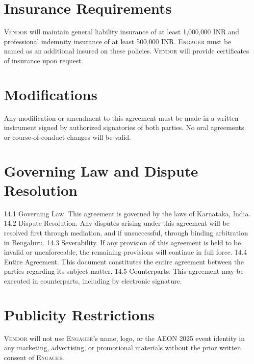 \documentclass[11pt,letterpaper]{article}
\begin{document}
\section{Insurance Requirements}
\textsc{Vendor} will maintain general liability insurance of at least 1,000,000 INR and professional indemnity insurance of at least 500,000 INR. \textsc{Engager} must be named as an additional insured on these policies. \textsc{Vendor} will provide certificates of insurance upon request.

\section{Modifications}
Any modification or amendment to this agreement must be made in a written instrument signed by authorized signatories of both parties. No oral agreements or course-of-conduct changes will be valid.

\section{Governing Law and Dispute Resolution}
14.1 Governing Law. This agreement is governed by the laws of Karnataka, India.
14.2 Dispute Resolution. Any disputes arising under this agreement will be resolved first through mediation, and if unsuccessful, through binding arbitration in Bengaluru.
14.3 Severability. If any provision of this agreement is held to be invalid or unenforceable, the remaining provisions will continue in full force.
14.4 Entire Agreement. This document constitutes the entire agreement between the parties regarding its subject matter.
14.5 Counterparts. This agreement may be executed in counterparts, including by electronic signature.

\section{Publicity Restrictions}
\textsc{Vendor} will not use \textsc{Engager}'s name, logo, or the AEON 2025 event identity in any marketing, advertising, or promotional materials without the prior written consent of \textsc{Engager}.
\end{document}
